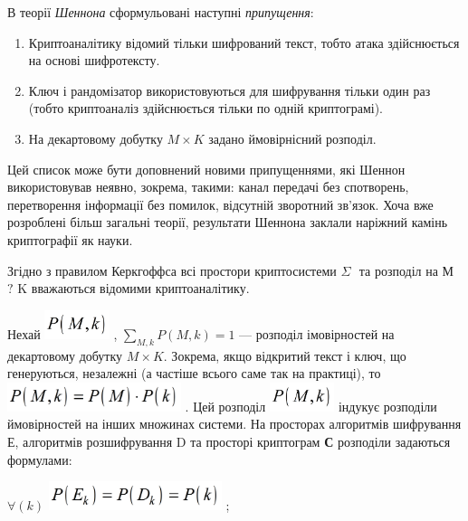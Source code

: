 В теорії \textit{Шеннона} сформульовані наступні \textit{припущення}:

\liststyleWWviiiNumxix
\begin{enumerate}
\item Криптоаналітику відомий тільки шифрований текст, тобто атака здійснюється
на основі шифротексту.
\item Ключ і рандомізатор використовуються для шифрування тільки один раз (тобто
криптоаналіз здійснюється тільки по одній криптограмі). 
\item На  декартовому добутку  $M\times K$ задано ймовірнісний розподіл.
\end{enumerate}
 Цей список може бути доповнений новими припущеннями, які Шеннон використовував
неявно, зокрема, такими:  канал передачі без спотворень, перетворення
інформації без помилок, відсутній зворотний зв’язок. Хоча вже розроблені більш
загальні теорії, результати Шеннона заклали наріжний камінь криптографії як
науки.

 Згідно з правилом Керкгоффса  всі простори криптосистеми   $\Sigma $ $ $ та
розподіл на  М $?$ K  вважаються відомими криптоаналітику.


\bigskip

Нехай 
\includegraphics[width=0.7437in,height=0.3339in]{crypt-img/crypt-img13.png} , 
$\underset{M,k}{\sum }{P(M,k)=1}$  --- розподіл імовірностей на декартовому
добутку  $M\times K$. Зокрема, якщо відкритий текст і ключ, що генеруються,
незалежні (а частіше всього саме так на практиці), то 
\includegraphics[width=1.9992in,height=0.3346in]{crypt-img/crypt-img14.png} .
Цей розподіл 
\includegraphics[width=0.7437in,height=0.3339in]{crypt-img/crypt-img15.png}  
індукує розподіли ймовірностей на інших множинах системи.  На просторах
алгоритмів шифрування Е, алгоритмів розшифрування  D та просторі  криптограм 
\textbf{С}  розподіли задаються формулами:

{\centering
 $\forall (k)$  
\includegraphics[width=1.9898in,height=0.3335in]{crypt-img/crypt-img16.png} ;
\par}

